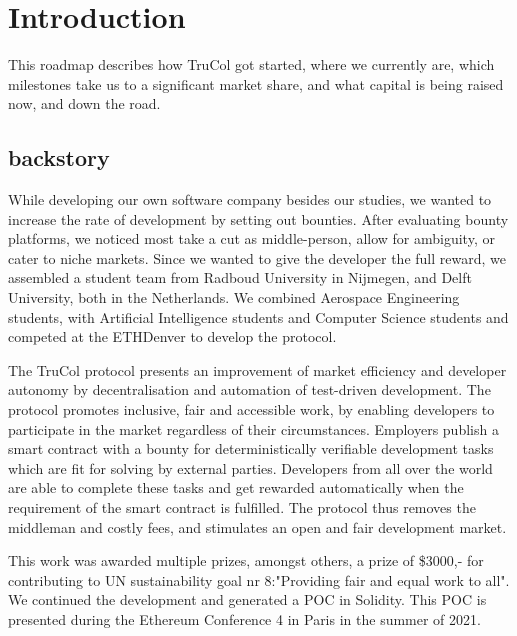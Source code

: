 \section{Introduction}
This roadmap describes how TruCol got started, where we currently are, which milestones take us to a significant market share, and what capital is being raised now, and down the road.

\subsection{backstory}
While developing our own software company besides our studies, we wanted to increase the rate of development by setting out bounties. After evaluating bounty platforms, we noticed most take a cut as middle-person, allow for ambiguity, or cater to niche markets. Since we wanted to give the developer the full reward, we assembled a student team from Radboud University in Nijmegen, and Delft University, both in the Netherlands. We combined Aerospace Engineering students, with Artificial Intelligence students and Computer Science students and competed at the ETHDenver to develop the protocol.

The TruCol protocol presents an improvement of market efficiency and developer autonomy by decentralisation and automation of test-driven development. The protocol promotes inclusive, fair and accessible work, by enabling developers to participate in the market regardless of their circumstances. Employers publish a smart contract with a bounty for deterministically verifiable development tasks which are fit for solving by external parties. Developers from all over the world are able to complete these tasks and get rewarded automatically when the requirement of the smart contract is fulfilled. The protocol thus removes the middleman and costly fees, and stimulates an open and fair development market.

This work was awarded multiple prizes, amongst others, a prize of \$3000,- for contributing to UN sustainability goal nr 8:"Providing fair and equal work to all". We continued the development and generated a POC in Solidity. This POC is presented during the Ethereum Conference 4 in Paris in the summer of 2021.
